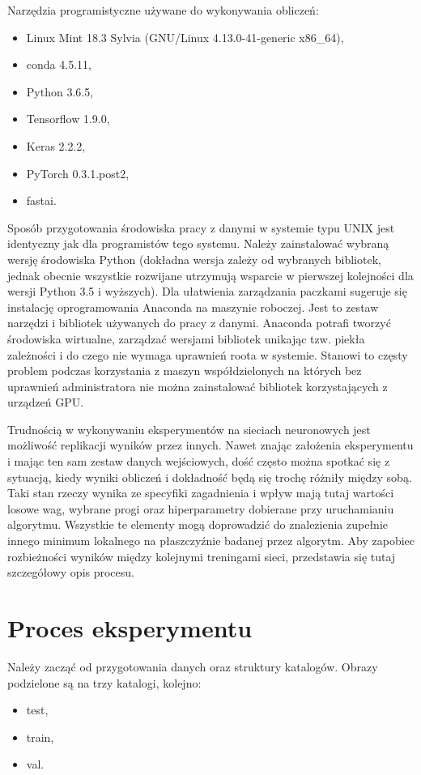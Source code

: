 \documentclass[12pt,a4paper,twoside,titlepage,openright]{book}
\begin{document}
Narzędzia programistyczne używane do wykonywania obliczeń:
\begin{itemize}
\item Linux Mint 18.3 Sylvia (GNU/Linux 4.13.0-41-generic x86\_64),
\item conda 4.5.11,
\item Python 3.6.5,
\item Tensorflow 1.9.0,
\item Keras 2.2.2,
\item PyTorch 0.3.1.post2,
\item fastai.
\end{itemize}

Sposób przygotowania środowiska pracy z danymi w systemie typu UNIX jest identyczny jak dla programistów tego systemu. Należy zainstalować wybraną wersję środowiska Python (dokładna wersja zależy od wybranych bibliotek, jednak obecnie wszystkie rozwijane utrzymują wsparcie w pierwszej kolejności dla wersji Python 3.5 i wyższych). Dla ułatwienia zarządzania paczkami sugeruje się instalację oprogramowania Anaconda na maszynie roboczej. Jest to zestaw narzędzi i bibliotek używanych do pracy z danymi. Anaconda potrafi tworzyć środowiska wirtualne, zarządzać wersjami bibliotek unikając tzw. piekła zależności i do czego nie wymaga uprawnień roota w systemie. Stanowi to częsty problem podczas korzystania z maszyn współdzielonych na których bez uprawnień administratora nie można zainstalować bibliotek korzystających z urządzeń GPU.

Trudnością  w wykonywaniu eksperymentów na sieciach neuronowych jest możliwość replikacji wyników przez innych. Nawet znając założenia eksperymentu i mając ten sam zestaw danych wejściowych, dość często można spotkać się z sytuacją, kiedy wyniki obliczeń i dokładność będą się trochę różniły między sobą. Taki stan rzeczy wynika ze specyfiki zagadnienia i wpływ mają tutaj wartości losowe wag, wybrane progi oraz hiperparametry dobierane przy uruchamianiu algorytmu. Wszystkie te elementy mogą doprowadzić do znalezienia zupełnie innego minimum lokalnego na płaszczyźnie badanej przez algorytm. Aby zapobiec rozbieżności wyników między kolejnymi treningami sieci, przedstawia się tutaj szczegółowy opis procesu.

\section{Proces eksperymentu}
Należy zacząć od przygotowania danych oraz struktury katalogów. Obrazy podzielone są na trzy katalogi, kolejno:
\begin{itemize}
\item test,
\item train,
\item val.
\end{itemize}
\end{document}
